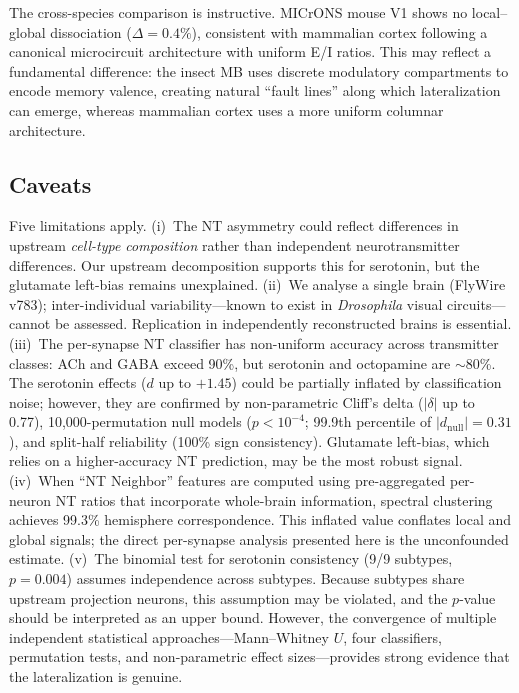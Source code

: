 \documentclass[10pt]{article}
\begin{document}
The cross-species comparison is instructive. MICrONS mouse V1 shows no local--global dissociation ($\Delta = 0.4\%$), consistent with mammalian cortex following a canonical microcircuit architecture with uniform E/I ratios\cite{microns2021cortical}. This may reflect a fundamental difference: the insect MB uses discrete modulatory compartments to encode memory valence\cite{aso2014mushroom}, creating natural ``fault lines'' along which lateralization can emerge, whereas mammalian cortex uses a more uniform columnar architecture.

\subsection*{Caveats}

Five limitations apply. (i)~The NT asymmetry could reflect differences in upstream \textit{cell-type composition} rather than independent neurotransmitter differences. Our upstream decomposition supports this for serotonin, but the glutamate left-bias remains unexplained. (ii)~We analyse a single brain (FlyWire v783); inter-individual variability---known to exist in \textit{Drosophila} visual circuits\cite{linneweber2020asymmetry}---cannot be assessed. Replication in independently reconstructed brains is essential. (iii)~The per-synapse NT classifier has non-uniform accuracy across transmitter classes: ACh and GABA exceed 90\%, but serotonin and octopamine are $\sim$80\%\cite{eckstein2020neurotransmitter}. The serotonin effects ($d$ up to $+1.45$) could be partially inflated by classification noise; however, they are confirmed by non-parametric Cliff's delta ($|\delta|$ up to 0.77), 10,000-permutation null models ($p < 10^{-4}$; 99.9th percentile of $|d_\mathrm{null}| = 0.31$), and split-half reliability (100\% sign consistency). Glutamate left-bias, which relies on a higher-accuracy NT prediction, may be the most robust signal. (iv)~When ``NT Neighbor'' features are computed using pre-aggregated per-neuron NT ratios that incorporate whole-brain information, spectral clustering achieves 99.3\% hemisphere correspondence. This inflated value conflates local and global signals; the direct per-synapse analysis presented here is the unconfounded estimate. (v)~The binomial test for serotonin consistency (9/9 subtypes, $p = 0.004$) assumes independence across subtypes. Because subtypes share upstream projection neurons, this assumption may be violated, and the $p$-value should be interpreted as an upper bound. However, the convergence of multiple independent statistical approaches---Mann--Whitney $U$, four classifiers, permutation tests, and non-parametric effect sizes---provides strong evidence that the lateralization is genuine.
\end{document}
